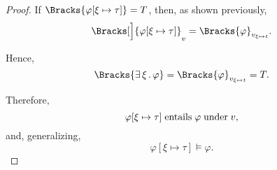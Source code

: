 \begin{proof}
   If \( \Bracks{\varphi[\xi \mapsto \tau]} = T \), then, as shown previously,
  \begin{equation*}
    \Bracks[\Big]{\varphi[\xi \mapsto \tau]}_v = \Bracks{\varphi}_{v_{\xi \mapsto t}}.
  \end{equation*}

  Hence,
  \begin{equation*}
    \Bracks{\qexists \xi \varphi} = \Bracks{\varphi}_{v_{\xi \mapsto t}} = T.
  \end{equation*}

  Therefore,
  \begin{equation*}
    \varphi[\xi \mapsto \tau] \T{entails} \varphi \T{under} v,
  \end{equation*}
  and, generalizing,
  \begin{equation*}
    \varphi[\xi \mapsto \tau] \vDash \varphi.
  \end{equation*}
\end{proof}

